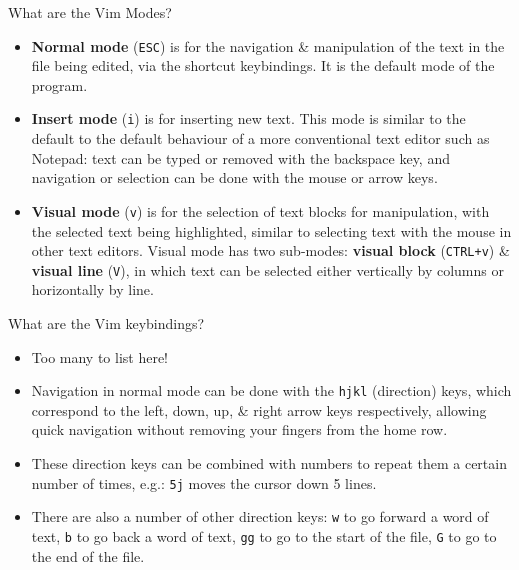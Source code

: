 \documentclass[]{beamer}
\begin{document}
\begin{frame}{What are the Vim Modes?}
    \begin{itemize}
        \item   \textbf{Normal mode} (\texttt{ESC}) is for the navigation \& manipulation of the text in the file
                being edited, via the shortcut keybindings.
                It is the default mode of the program.
        \item   \textbf{Insert mode} (\texttt{i}) is for inserting new text. This mode is similar to the
                default to the default behaviour of a more conventional text editor such as Notepad: text can be typed
                or removed with the backspace key, and navigation or selection can be done with the mouse or arrow
                keys.
        \item   \textbf{Visual mode} (\texttt{v}) is for the selection of text blocks for manipulation, with the
                selected text being highlighted, similar to selecting text with the mouse in other text editors.
                Visual mode has two sub-modes: \textbf{visual block} (\texttt{CTRL+v}) \& \textbf{visual line}
                (\texttt{V}), in which text can be selected either vertically by columns or horizontally by line.
    \end{itemize}
\end{frame}

\begin{frame}{What are the Vim keybindings?}
    \begin{itemize}
        \item   Too many to list here!
        \item   Navigation in normal mode can be done with the \texttt{hjkl} (direction) keys, which correspond to
                the left, down, up, \& right arrow keys respectively, allowing quick navigation without removing your
                fingers from the home row.
        \item   These direction keys can be combined with numbers to repeat them a certain number of times, e.g.:
                \texttt{5j} moves the cursor down 5 lines.
        \item   There are also a number of other direction keys: \texttt{w} to go forward a word of text, \texttt{b} to
                go back a word of text, \texttt{gg} to go to the start of the file, \texttt{G} to go to the end of the
                file.
    \end{itemize}
\end{frame}
\end{document}
